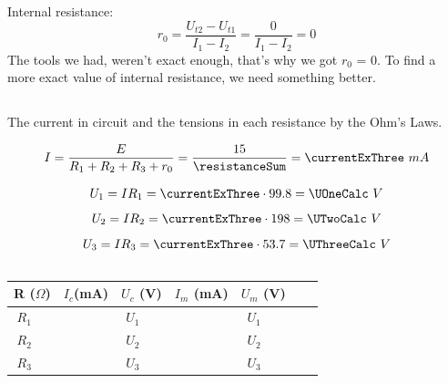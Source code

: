 \documentclass{article}
\begin{document}
		\subsection{}
			Internal resistance:
			\[
				r_0 = \frac{U_{t2} - U_{t1}}{I_1 - I_2} = \frac{0}{I_1 - I_2} = 0
			\]
			The tools we had, weren't exact enough, that's why we got $r_0$ = 0. To find a more exact value of internal resistance, we need something better.

		\subsection{}
			The current in circuit and the tensions in each resistance by the Ohm's Laws.



			\[
				I = \frac{E}{R_1 + R_2 + R_3 + r_0} = \frac{15}{\resistanceSum} = \currentExThree \ mA
			\]
			



			\[U_1 = IR_1 = \currentExThree \cdot \ROne = \UOneCalc \ V\]
			\[U_2 = IR_2 = \currentExThree \cdot \RTwo = \UTwoCalc \ V\]
			\[U_3 = IR_3 = \currentExThree \cdot \RThree = \UThreeCalc \ V\]

		\subsection{}
			\begin{center} \begin{tabular}{|c|c|c|c|c|c|c|c|c|c|}
				\hline
				\multicolumn{2}{|c|}{R ($\Omega$)} &$
					I_{c}$(mA) &
					\multicolumn{2}{c|}{$U_c$ (V)} &
					$I_{m}$ (mA) &
					\multicolumn{2}{c|}{$U_m$ (V)} \\

				\hline
				
				$R_1$ & \ROne &
					\multirow{3}{*}{\currentExThree} &
					$U_1$ & \UOneCalc &
					\multirow{3}{*}{\IPosOne} &
					$U_1$ & \UExOneOne\\
				
				\cline{1-2} \cline{4-5} \cline{7-8}

				$R_2$ & \RTwo & & $U_2$ & \UTwoCalc & & $U_2$ & \UExOneTwo\\		
				\cline{1-2} \cline{4-5} \cline{7-8}
				
				$R_3$ & \RThree & & $U_3$ & \UThreeCalc & & $U_3$ & \UExOneThree\\
				\hline
			\end{tabular} \end{center}
\end{document}
